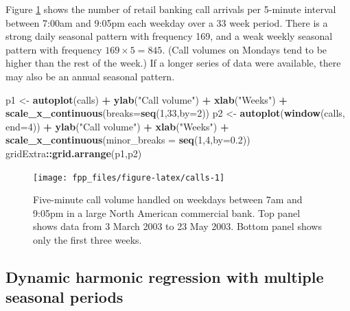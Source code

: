 \documentclass[]{book}
\newenvironment{Shaded}{\begin{snugshade}}{\end{snugshade}}
\newcommand{\DataTypeTok}[1]{\textcolor[rgb]{0.13,0.29,0.53}{#1}}
\newcommand{\DecValTok}[1]{\textcolor[rgb]{0.00,0.00,0.81}{#1}}
\newcommand{\FloatTok}[1]{\textcolor[rgb]{0.00,0.00,0.81}{#1}}
\newcommand{\KeywordTok}[1]{\textcolor[rgb]{0.13,0.29,0.53}{\textbf{#1}}}
\newcommand{\NormalTok}[1]{#1}
\newcommand{\OperatorTok}[1]{\textcolor[rgb]{0.81,0.36,0.00}{\textbf{#1}}}
\newcommand{\StringTok}[1]{\textcolor[rgb]{0.31,0.60,0.02}{#1}}
\begin{document}
Figure \ref{fig:calls} shows the number of retail banking call arrivals per 5-minute interval between 7:00am and 9:05pm each weekday over a 33 week period. There is a strong daily seasonal pattern with frequency 169, and a weak weekly seasonal pattern with frequency \(169 \times 5=845\). (Call volumes on Mondays tend to be higher than the rest of the week.) If a longer series of data were available, there may also be an annual seasonal pattern.

\begin{Shaded}
\begin{Highlighting}[]
\NormalTok{p1 <-}\StringTok{ }\KeywordTok{autoplot}\NormalTok{(calls) }\OperatorTok{+}
\StringTok{  }\KeywordTok{ylab}\NormalTok{(}\StringTok{"Call volume"}\NormalTok{) }\OperatorTok{+}\StringTok{ }\KeywordTok{xlab}\NormalTok{(}\StringTok{"Weeks"}\NormalTok{) }\OperatorTok{+}
\StringTok{  }\KeywordTok{scale_x_continuous}\NormalTok{(}\DataTypeTok{breaks=}\KeywordTok{seq}\NormalTok{(}\DecValTok{1}\NormalTok{,}\DecValTok{33}\NormalTok{,}\DataTypeTok{by=}\DecValTok{2}\NormalTok{))}
\NormalTok{p2 <-}\StringTok{ }\KeywordTok{autoplot}\NormalTok{(}\KeywordTok{window}\NormalTok{(calls, }\DataTypeTok{end=}\DecValTok{4}\NormalTok{)) }\OperatorTok{+}
\StringTok{  }\KeywordTok{ylab}\NormalTok{(}\StringTok{"Call volume"}\NormalTok{) }\OperatorTok{+}\StringTok{ }\KeywordTok{xlab}\NormalTok{(}\StringTok{"Weeks"}\NormalTok{) }\OperatorTok{+}
\StringTok{  }\KeywordTok{scale_x_continuous}\NormalTok{(}\DataTypeTok{minor_breaks =} \KeywordTok{seq}\NormalTok{(}\DecValTok{1}\NormalTok{,}\DecValTok{4}\NormalTok{,}\DataTypeTok{by=}\FloatTok{0.2}\NormalTok{))}
\NormalTok{gridExtra}\OperatorTok{::}\KeywordTok{grid.arrange}\NormalTok{(p1,p2)}
\end{Highlighting}
\end{Shaded}

\begin{figure}

{\centering \texttt{[image: fpp\_files/figure-latex/calls-1]} 

}

\caption{Five-minute call volume handled on weekdays between 7am and 9:05pm in a large North American commercial bank. Top panel shows data from 3 March 2003 to 23 May 2003. Bottom panel shows only the first three weeks.}\label{fig:calls}
\end{figure}

\hypertarget{dynamic-harmonic-regression-with-multiple-seasonal-periods}{%
\subsection*{Dynamic harmonic regression with multiple seasonal periods}\label{dynamic-harmonic-regression-with-multiple-seasonal-periods}}
\end{document}
